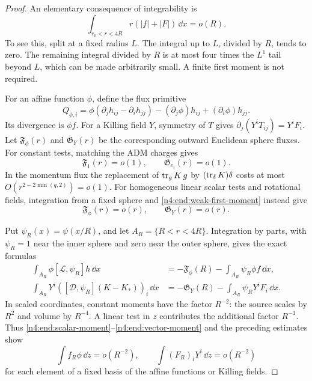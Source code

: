 \begin{proof}
An elementary consequence of integrability is
\begin{equation}\label{n4:end:weak-first-moment}
 \int_{r_0<r<4R}r(|f|+|F|)\,\dd x=o(R).
\end{equation}
To see this, split at a fixed radius \(L\). The integral up to \(L\),
divided by \(R\), tends to zero. The remaining integral divided by
\(R\) is at most four times the \(L^1\) tail beyond \(L\), which can
be made arbitrarily small. A finite first moment is not required.

For an affine function \(\phi\), define the flux primitive
\[
 Q_{\phi,i}
 =\phi(\partial_jh_{ij}-\partial_i h_{jj})
       -(\partial_j\phi)h_{ij}+(\partial_i\phi)h_{jj}.
\]
Its divergence is \(\phi f\). For a Killing field \(Y\), symmetry
of \(T\) gives \(\partial_j(Y^iT_{ij})=Y^iF_i\).
Let \(\mathfrak F_\phi(r)\) and \(\mathfrak G_Y(r)\) be the corresponding
outward Euclidean sphere fluxes. For constant tests, matching the ADM
charges gives
\[
 \mathfrak F_1(r)=o(1),\qquad
 \mathfrak G_{e_i}(r)=o(1).
\]
In the momentum flux the replacement of \(\operatorname{tr}_gK\,g\) by
\((\operatorname{tr}_\delta K)\delta\) costs at most
\(O(r^{2-2\min(q,2)})=o(1)\). For homogeneous linear scalar tests and
rotational fields, integration from a fixed sphere and
\eqref{n4:end:weak-first-moment} instead give
\[
 \mathfrak F_\phi(r)=o(r),\qquad \mathfrak G_Y(r)=o(r).
\]

Put \(\psi_R(x)=\psi(x/R)\), and let \(A_R=\{R<r<4R\}\).
Integration by parts, with \(\psi_R=1\) near the inner sphere and zero
near the outer sphere, gives the exact formulas
\begin{align}
 \int_{A_R}\phi[\mathcal L,\psi_R]h\,\dd x
  &=-\mathfrak F_\phi(R)-\int_{A_R}\psi_R\phi f\,\dd x,
       \label{n4:end:scalar-moment}\\
 \int_{A_R}Y^i([\mathcal D,\psi_R](K-K_*))_i\,\dd x
  &=-\mathfrak G_Y(R)-\int_{A_R}\psi_RY^iF_i\,\dd x.
       \label{n4:end:vector-moment}
\end{align}
In scaled coordinates, constant moments have the factor \(R^{-2}\):
the source scales by \(R^2\) and volume by \(R^{-4}\).
A linear test in \(z\) contributes the additional factor \(R^{-1}\).
Thus \eqref{n4:end:scalar-moment}--\eqref{n4:end:vector-moment} and the preceding
estimates show
\begin{equation}\label{n4:end:small-moments}
 \int f_R\phi\,\dd z=o(R^{-2}),\qquad
 \int (F_R)_iY^i\,\dd z=o(R^{-2})
\end{equation}
for each element of a fixed basis of the affine functions or Killing
fields.


\end{proof}
